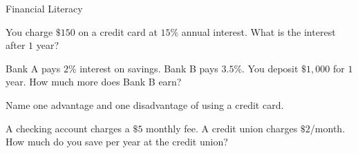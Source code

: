 \begin{practiceBox}{Financial Literacy}
\resetProblems

\prob You charge $\$150$ on a credit card at $15\%$ annual interest. What is the interest after $1$ year?

\prob Bank A pays $2\%$ interest on savings. Bank B pays $3.5\%$. You deposit $\$1{,}000$ for $1$ year. How much more does Bank B earn?


\prob Name one advantage and one disadvantage of using a credit card.

\prob A checking account charges a $\$5$ monthly fee. A credit union charges $\$2$/month. How much do you save per year at the credit union?

\end{practiceBox}
